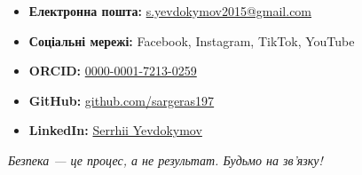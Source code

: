 \begin{itemize}
    \setlength\itemsep{0.2em} %
    \setlength\parskip{0pt}
    
    \item \textbf{Електронна пошта:} \href{mailto:s.yevdokymov2015@gmail.com}{s.yevdokymov2015@gmail.com}
    \item \textbf{Соціальні мережі:} Facebook, Instagram, TikTok, YouTube
    \item \textbf{ORCID:} \href{https://orcid.org/0000-0001-7213-0259}{0000-0001-7213-0259}
    \item \textbf{GitHub:} \href{https://github.com/sargeras197}{github.com/sargeras197}
    \item \textbf{LinkedIn:} \href{https://www.linkedin.com/in/sergey-yevdokymov}{Serrhii Yevdokymov} 
    


    
\end{itemize}

\vspace{0.2cm}

\begin{center}
    \textit{Безпека — це процес, а не результат. Будьмо на зв'язку!}
\end{center}

\clearpage

